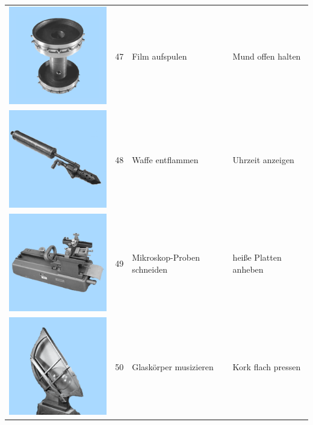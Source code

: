 \documentclass[
  english,
  doc,12pt,twoside,floatsintext]{apa7}
\begin{document}
\begin{center}
\begin{ThreePartTable}
\begin{longtable}{llll}
\includegraphics[valign=c, scale=0.19]{../materials/unfamiliar/47.png} & 47 & Film aufspulen & Mund offen halten\\
\includegraphics[valign=c, scale=0.19]{../materials/unfamiliar/48.png} & 48 & Waffe entflammen & Uhrzeit anzeigen\\
\includegraphics[valign=c, scale=0.19]{../materials/unfamiliar/49.png} & 49 & Mikroskop-Proben schneiden & heiße Platten anheben\\
\includegraphics[valign=c, scale=0.19]{../materials/unfamiliar/50.png} & 50 & Glaskörper musizieren & Kork flach pressen\\

\end{longtable}
\end{ThreePartTable}
\end{center}
\end{document}
